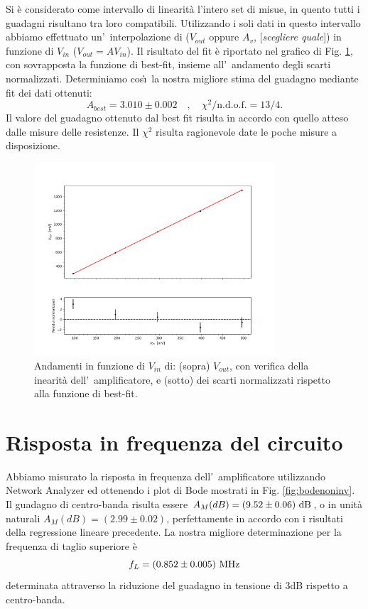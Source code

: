 \documentclass[10pt,a4paper]{article}
\newcommand{\rem}[1]{[\emph{#1}]}
\begin{document}
Si è considerato come intervallo di linearità l'intero set di misue, in quento tutti i guadagni risultano tra loro compatibili.
Utilizzando i soli dati in questo intervallo abbiamo effettuato un'~interpolazione di ($V_{out}$ oppure $A_v$, \rem{scegliere 
quale}) in funzione di $V_{in}$ ($V_{out}=AV_{in}$). Il risultato del fit \`e riportato nel grafico di Fig. \ref{fig:lin}, 
con sovrapposta la funzione di best-fit, insieme all'~andamento degli scarti normalizzati. Determiniamo cos\`\i\  la nostra migliore 
stima del guadagno mediante fit dei dati ottenuti:
\[
A_{best} = 3.010 \pm 0.002 \quad,\quad  \chi^2/\mbox{n.d.o.f.} = 13/4.
\]
Il valore del guadagno ottenuto dal best fit risulta in accordo con quello atteso dalle misure delle resistenze. Il $\chi^2$ risulta ragionevole date le poche misure a disposizione.
\begin{figure}[t]
\begin{center}
\includegraphics[width=0.8\textwidth]{fitconresidui4.png}
\end{center}
\caption{\small Andamenti in funzione di $V_{in}$ di: (sopra) $V_{out}$, con verifica della inearit\`a dell'~amplificatore, e (sotto) 
dei scarti normalizzati rispetto alla funzione di best-fit.}
\label{fig:lin}
\end{figure}
%
%
\section{Risposta in frequenza del circuito}
Abbiamo misurato la risposta in frequenza dell'~amplificatore utilizzando Network Analyzer ed ottenendo i plot di Bode mostrati 
in Fig. \ref{fig:bodenoninv}. Il guadagno di centro-banda risulta essere $A_M (dB) = (9.52 \pm 0.06 ) \ \rm dB$, o in unità naturali $A_M (dB) = (2.99 \pm  0.02)$, perfettamente in accordo con i risultati della regressione lineare precedente. La nostra migliore determinazione per 
la frequenza di taglio superiore \`e
\[
f_L = (0.852 \pm 0.005 ) \  \rm MHz
\]
determinata attraverso la riduzione del guadagno in tensione di 3dB rispetto a centro-banda. 
\end{document}
